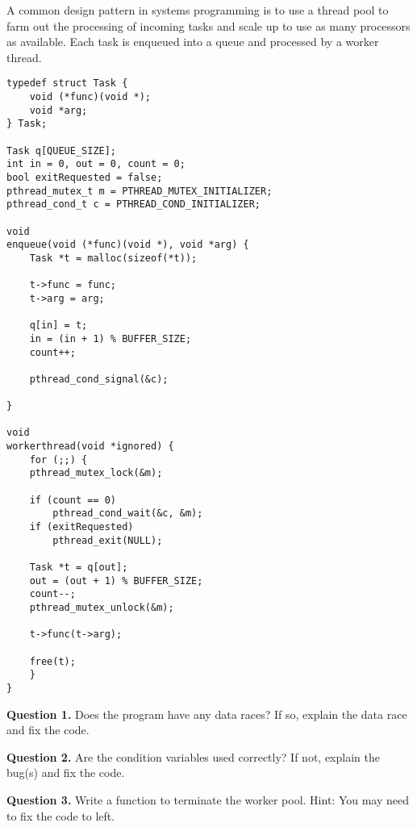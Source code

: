 \documentclass[letterpaper,twocolumn,10pt]{article}
\begin{document}
A common design pattern in systems programming is to use a thread pool to farm 
out the processing of incoming tasks and scale up to use as many processors as 
available.  Each task is enqueued into a queue and processed by a worker 
thread.

\begin{lstlisting}[style=CStyle]
typedef struct Task {
    void (*func)(void *);
    void *arg;
} Task;

Task q[QUEUE_SIZE];
int in = 0, out = 0, count = 0;
bool exitRequested = false;
pthread_mutex_t m = PTHREAD_MUTEX_INITIALIZER;
pthread_cond_t c = PTHREAD_COND_INITIALIZER;

void
enqueue(void (*func)(void *), void *arg) {
    Task *t = malloc(sizeof(*t));

    t->func = func;
    t->arg = arg;

    q[in] = t;
    in = (in + 1) % BUFFER_SIZE;
    count++;

    pthread_cond_signal(&c);

}

void
workerthread(void *ignored) {
    for (;;) {
	pthread_mutex_lock(&m);

	if (count == 0)
	    pthread_cond_wait(&c, &m);
	if (exitRequested)
	    pthread_exit(NULL);

	Task *t = q[out];
	out = (out + 1) % BUFFER_SIZE;
	count--;
	pthread_mutex_unlock(&m);

	t->func(t->arg);

	free(t);
    }
}

\end{lstlisting}

\break

\noindent
\textbf{Question 1.} Does the program have any data races?  If so, explain the 
data race and fix the code.

\vspace{16em}

\noindent
\textbf{Question 2.} Are the condition variables used correctly?  If not, 
explain the bug(s) and fix the code.

\vspace{16em}

\textbf{Question 3.} Write a function to terminate the worker pool.  Hint: You 
may need to fix the code to left.

\vspace{16em}
\end{document}
